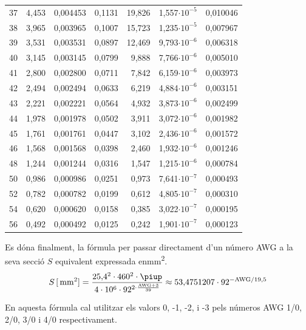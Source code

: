 \begin{longtable}{crrrrrr}
37 &      4,453 &   0,004453 &     0,1131 &     19,826 &  1,557$\cdot 10^{-5}$ &   0,010046 \\
38 &      3,965 &   0,003965 &     0,1007 &     15,723 &  1,235$\cdot 10^{-5}$ &   0,007967 \\
39 &      3,531 &   0,003531 &     0,0897 &     12,469 &  9,793$\cdot 10^{-6}$ &   0,006318 \\
40 &      3,145 &   0,003145 &     0,0799 &      9,888 &  7,766$\cdot 10^{-6}$ &   0,005010 \\
41 &      2,800 &   0,002800 &     0,0711 &      7,842 &  6,159$\cdot 10^{-6}$ &   0,003973 \\
42 &      2,494 &   0,002494 &     0,0633 &      6,219 &  4,884$\cdot 10^{-6}$ &   0,003151 \\
43 &      2,221 &   0,002221 &     0,0564 &      4,932 &  3,873$\cdot 10^{-6}$ &   0,002499 \\
44 &      1,978 &   0,001978 &     0,0502 &      3,911 &  3,072$\cdot 10^{-6}$ &   0,001982 \\
45 &      1,761 &   0,001761 &     0,0447 &      3,102 &  2,436$\cdot 10^{-6}$ &   0,001572 \\
46 &      1,568 &   0,001568 &     0,0398 &      2,460 &  1,932$\cdot 10^{-6}$ &   0,001246 \\
48 &      1,244 &   0,001244 &     0,0316 &      1,547 &  1,215$\cdot 10^{-6}$ &   0,000784 \\
50 &      0,986 &   0,000986 &     0,0251 &      0,973 &  7,641$\cdot 10^{-7}$ &   0,000493 \\
52 &      0,782 &   0,000782 &     0,0199 &      0,612 &  4,805$\cdot 10^{-7}$ &   0,000310
\\
54 &      0,620 &   0,000620 &     0,0158 &      0,385 &  3,022$\cdot 10^{-7}$ &   0,000195
\\
56 &      0,492 &   0,000492 &     0,0125 &      0,242 &  1,901$\cdot 10^{-7}$ &   0,000123
\\
\bottomrule[1pt]
\end{longtable}

 Es d\'{o}na finalment, la f\'{o}rmula per passar directament d'un n\'{u}mero AWG a la seva secci\'{o} $S$ equivalent expressada en\unit{mm^2}.
\begin{equation}
   S \,[\unit{mm^2}]= \frac{25{,}4^2 \cdot 460^2 \cdot \piup}{4 \cdot 10^6 \cdot 92^{2\cdot\frac{\text{AWG}+3}{39}}} \approx
   53{,}4751207 \cdot 92^{-\text{AWG}/19{,}5}\label{eq:awg_mm2}
\end{equation}

En aquesta f\'{o}rmula cal utilitzar els valors 0, -1, -2, i -3  pels n\'{u}meros AWG 1/0,
2/0, 3/0 i 4/0 respectivament.
